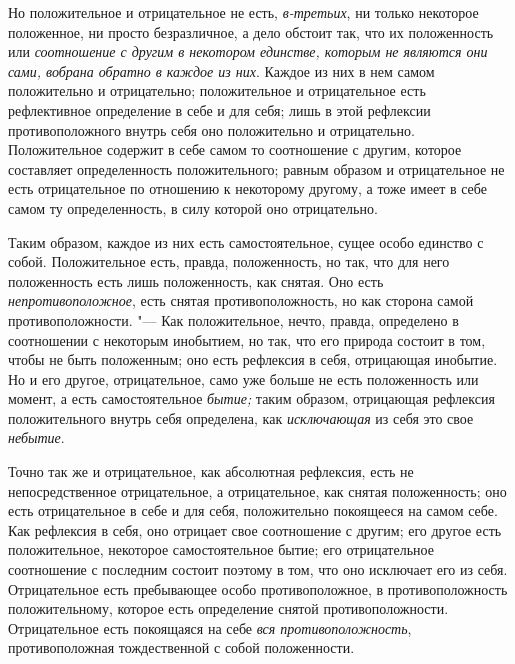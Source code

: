 Но положительное и отрицательное не есть,
{\em в-третьих}, ни только некоторое положенное, ни
просто безразличное, а дело обстоит так, что их положенность или
{\em соотношение с другим в некотором единстве, которым
не являются они сами, вобрана обратно в каждое из них}. Каждое из них в нем
самом положительно и отрицательно; положительное и отрицательное есть
рефлективное определение в себе и для себя; лишь в этой рефлексии
противоположного внутрь себя оно положительно и отрицательно. Положительное
содержит в себе самом то соотношение с другим, которое составляет
определенность положительного; равным образом и отрицательное не есть
отрицательное по отношению к некоторому другому, а тоже имеет в себе самом
ту определенность, в силу которой оно отрицательно.

Таким образом, каждое из них есть самостоятельное, сущее особо единство с
собой. Положительное есть, правда, положенность, но так, что для него
положенность есть лишь положенность, как снятая. Оно есть
{\em непротивоположное}, есть снятая противоположность,
но как сторона самой противоположности. "--- Как положительное, нечто, правда,
определено в соотношении с некоторым инобытием, но так, что его природа
состоит в том, чтобы не быть положенным; оно есть рефлексия в себя,
отрицающая инобытие. Но и его другое, отрицательное, само уже больше не
есть положенность или момент, а есть самостоятельное
{\em бытие;} таким образом, отрицающая рефлексия
положительного внутрь себя определена, как
{\em исключающая} из себя это свое {\em небытие}.

Точно так же и отрицательное, как абсолютная рефлексия, есть не
непосредственное отрицательное, а отрицательное, как снятая положенность;
оно есть отрицательное в себе и для себя, положительно покоящееся на самом
себе. Как рефлексия в себя, оно отрицает свое соотношение с другим; его
другое есть положительное, некоторое самостоятельное бытие; его
отрицательное соотношение с последним состоит поэтому в том, что оно
исключает его из себя. Отрицательное есть пребывающее особо
противоположное, в противоположность положительному, которое есть
определение снятой противоположности. Отрицательное есть покоящаяся на себе
{\em вся противоположность}, противоположная
тождественной с собой положенности.

